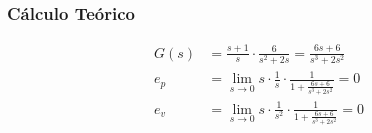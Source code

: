\documentclass[paper=a4, fontsize=11pt]{scrreprt} %
\numberwithin{equation}{section} %
\numberwithin{figure}{section} %
\numberwithin{table}{section} %
\begin{document}
    \subsubsection{Cálculo Teórico}
    \begin{align}
        G(s) &= \frac{s+1}{s} \cdot \frac{6}{s^2+2s} = \frac{6s+6}{s^3+2s^2}\\
        e_p &= \lim\limits_{s \rightarrow 0} s \cdot \frac{1}{s} \cdot \frac{1}{1+\frac{6s+6}{s^3+2s^2}} = 0\\
        e_v &= \lim\limits_{s \rightarrow 0} s \cdot \frac{1}{s^2} \cdot \frac{1}{1+\frac{6s+6}{s^3+2s^2}} = 0
    \end{align}
\end{document}
